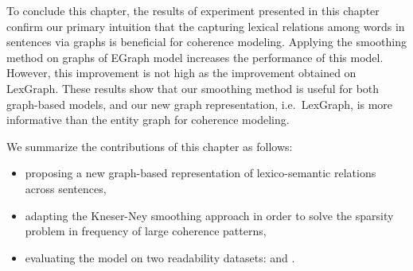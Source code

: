 To conclude this chapter, the results of experiment presented in this chapter confirm our primary intuition that the capturing lexical relations among words in sentences via graphs is beneficial for coherence modeling. 
Applying the smoothing method on graphs of EGraph model increases the performance of this model. 
However, this improvement is not high as the improvement obtained on LexGraph.
These results show that our smoothing method is useful for both graph-based models, and our new graph representation, i.e.\ LexGraph, is more informative than the entity graph for coherence modeling. 

We summarize the contributions of this chapter as follows:

\begin{itemize}

  \item proposing a new \mbox{graph-based} representation of lexico-semantic relations across sentences,

  \item adapting the \mbox{Kneser-Ney} smoothing approach in order to solve the sparsity problem in frequency of large coherence patterns,  

  \item evaluating the model on two readability datasets:  and .

\end{itemize}
